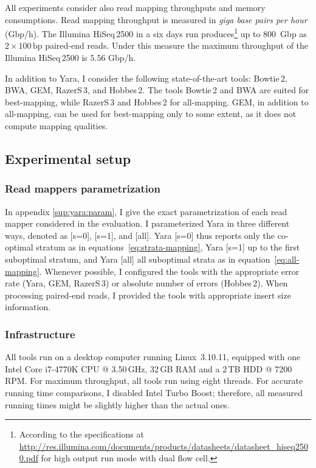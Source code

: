 All experiments consider also read mapping throughputs and memory consumptions.
Read mapping throughput is measured in \emph{giga base pairs per hour} (Gbp/h).
The Illumina HiSeq\,2500 in a six days run produces\footnote{According to the specifications at \url{http://res.illumina.com/documents/products/datasheets/datasheet_hiseq2500.pdf} for high output run mode with dual flow cell.} up to 800~Gbp as $2 \times 100\,\text{bp}$ paired-end reads.
Under this measure the maximum throughput of the Illumina HiSeq\,2500 is $5.56$ Gbp/h.

In addition to Yara, I consider the following state-of-the-art tools: Bowtie\,2, BWA, GEM, RazerS\,3, and Hobbes\,2.
The tools Bowtie\,2 and BWA are suited for best-mapping, while RazerS\,3 and Hobbes\,2 for all-mapping.
GEM, in addition to all-mapping, can be used for best-mapping only to some extent, as it does not compute mapping qualities.

\subsection{Experimental setup}

\subsubsection{Read mappers parametrization}

In appendix \ref{sup:yara:param}, I give the exact parametrization of each read mapper considered in the evaluation.
I parameterized Yara in three different ways, denoted as [s=0], [s=1], and [all].
Yara [s=0] thus reports only the co-optimal stratum as in equations~\ref{eq:strata-mapping}, Yara [s=1] up to the first suboptimal stratum, and Yara [all] all suboptimal strata as in equation~\ref{eq:all-mapping}.
Whenever possible, I configured the tools with the appropriate error rate (Yara, GEM, RazerS\,3) or absolute number of errors (Hobbes\,2).
When processing paired-end reads, I provided the tools with appropriate insert size information.

\subsubsection{Infrastructure}

All tools run on a desktop computer running Linux~3.10.11, equipped with one Intel\textsuperscript{\textregistered} Core i7-4770K CPU @ 3.50\,GHz, 32\,GB RAM and a 2\,TB HDD @ 7200\,RPM.
For maximum throughput, all tools run using eight threads.
For accurate running time comparisons, I disabled Intel Turbo Boost; therefore, all measured running times might be slightly higher than the actual ones.

